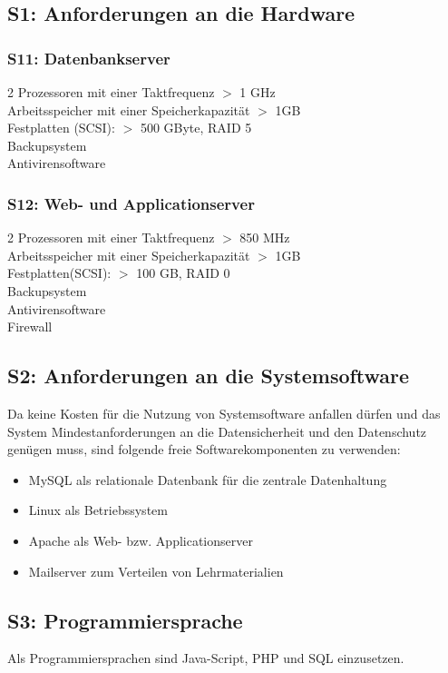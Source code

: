 \documentclass[10pt,a4paper]{scrartcl}
\begin{document}
\subsection{S1: Anforderungen an die Hardware}
\subsubsection*{S11: Datenbankserver}

2 Prozessoren mit einer Taktfrequenz $>$ 1 GHz\\
Arbeitsspeicher mit einer Speicherkapazität $>$ 1GB\\
Festplatten (SCSI): $>$ 500 GByte, RAID 5\\
Backupsystem\\
Antivirensoftware

\subsubsection*{S12: Web- und Applicationserver}

2 Prozessoren mit einer Taktfrequenz $>$ 850 MHz\\
Arbeitsspeicher mit einer Speicherkapazität $>$ 1GB\\
Festplatten(SCSI): $>$ 100 GB, RAID 0\\
Backupsystem\\
Antivirensoftware\\
Firewall

\subsection{S2: Anforderungen an die Systemsoftware}
Da keine Kosten für die Nutzung von Systemsoftware anfallen dürfen und das System Mindestanforderungen an die Datensicherheit und den Datenschutz genügen muss, sind folgende freie Softwarekomponenten zu verwenden:
\begin{itemize}
\item MySQL als relationale Datenbank für die zentrale Datenhaltung
\item Linux als Betriebssystem
\item Apache als Web- bzw. Applicationserver
\item Mailserver zum Verteilen von Lehrmaterialien
\end{itemize}

\subsection{S3: Programmiersprache}
Als Programmiersprachen sind Java-Script, PHP und SQL einzusetzen.
\end{document}
